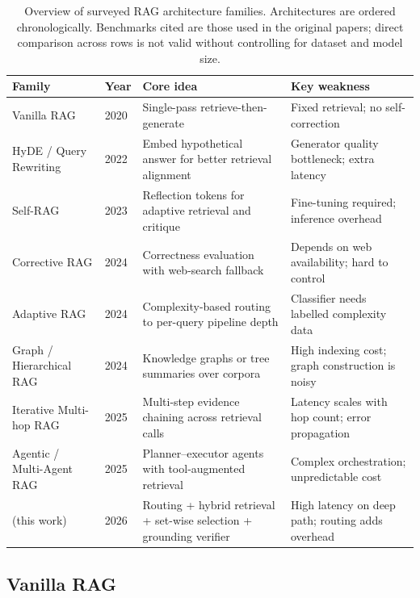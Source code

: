 \begin{table}[htbp]
  \centering
  \caption[Overview of surveyed RAG architecture families.]{Overview of surveyed RAG architecture families.
    Architectures are ordered chronologically.
    Benchmarks cited are those used in the original papers; direct comparison
    across rows is not valid without controlling for dataset and model size.}
  \label{tab:rag_families}
  \small
  \begin{tabularx}{\textwidth}{@{}llXX@{}}
    \toprule
    \textbf{Family} & \textbf{Year} & \textbf{Core idea} & \textbf{Key weakness} \\
    \midrule
    Vanilla RAG
      & 2020
      & Single-pass retrieve-then-generate
      & Fixed retrieval; no self-correction \\
    HyDE / Query Rewriting
      & 2022
      & Embed hypothetical answer for better retrieval alignment
      & Generator quality bottleneck; extra latency \\
    Self-RAG
      & 2023
      & Reflection tokens for adaptive retrieval and critique
      & Fine-tuning required; inference overhead \\
    Corrective RAG
      & 2024
      & Correctness evaluation with web-search fallback
      & Depends on web availability; hard to control \\
    Adaptive RAG
      & 2024
      & Complexity-based routing to per-query pipeline depth
      & Classifier needs labelled complexity data \\
    Graph / Hierarchical RAG
      & 2024
      & Knowledge graphs or tree summaries over corpora
      & High indexing cost; graph construction is noisy \\
    Iterative Multi-hop RAG
      & 2025
      & Multi-step evidence chaining across retrieval calls
      & Latency scales with hop count; error propagation \\
    Agentic / Multi-Agent RAG
      & 2025
      & Planner--executor agents with tool-augmented retrieval
      & Complex orchestration; unpredictable cost \\
    \rarerag{} (this work)
      & 2026
      & Routing + hybrid retrieval + set-wise selection + grounding verifier
      & High latency on deep path; routing adds overhead \\
    \bottomrule
  \end{tabularx}
\end{table}

\subsection{Vanilla RAG}
\label{subsec:vanilla_rag}

